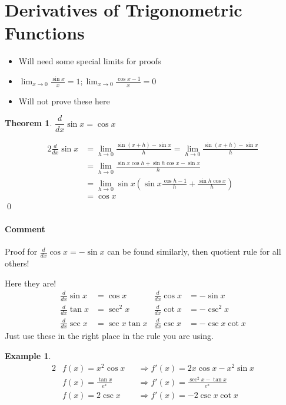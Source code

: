 \documentclass[letterpaper, 11pt, openany]{book}
\theoremstyle{mytheoremstyle}
\newtheorem{theorem}{Theorem}[section]
\renewenvironment{proof}{{\par \sffamily \smaller \fontseries{b}\selectfont Proof}}{\hfill\qed}
\theoremstyle{myexamplestyle}
\newtheorem{example}{Example}[section]
\newenvironment{commentary}{\paragraph{\sffamily \smaller \fontseries{b}\selectfont Comment}}{}
\begin{document}
\section{Derivatives of Trigonometric Functions}

\begin{itemize}
    \item Will need some special limits for proofs
    \item \(\displaystyle \lim_{x \to 0} \frac{\sin x}{x} = 1; \lim_{x \to 0} \frac{\cos x - 1}{x} = 0\)
    \item Will not prove these here
\end{itemize}

\begin{theorem}
    \(\dfrac{d}{dx} \sin x = \cos x\)
\end{theorem}
\begin{proof}
    \begin{alignat*}{2}
        \frac{d}{dx} \sin x     &= \lim_{h \to 0} \frac{\sin(x+h) - \sin x}{h} = \lim_{h \to 0} \frac{\sin(x+h) - \sin x}{h}\\
                                &= \lim_{h \to 0} \frac{\sin x \cos h + \sin h \cos x - \sin x}{h}\\
                                &= \lim_{h \to 0} \sin x\left(\sin x\frac{\cos h - 1}{h} + \frac{\sin h \cos x}{h}\right)\\
                                &= \cos x
    \end{alignat*}
\end{proof}
\begin{commentary}
    Proof for \(\frac{d}{dx} \cos x = -\sin x\) can be found similarly, then quotient rule for all others!
\end{commentary}

Here they are!
\begin{align*}
    \frac{d}{dx} \sin x &= \cos x           & \frac{d}{dx} \cos x &= -\sin x\\
    \frac{d}{dx} \tan x &= \sec^{2} x       & \frac{d}{dx} \cot x &= -\csc^{2} x\\
    \frac{d}{dx} \sec x &= \sec x \tan x    & \frac{d}{dx} \csc x &= -\csc x \cot x
\end{align*}
Just use these in the right place in the rule you are using.

\begin{example}
    \begin{alignat*}{2}
        &f(x) = x^{2}\cos x &&\Rightarrow f'(x) = 2x \cos x - x^{2}\sin x\\
        &f(x) = \frac{\tan x}{e^{x}} &&\Rightarrow f'(x) = \frac{\sec^{2}x - \tan x}{e^{x}}\\
        &f(x) = 2\csc x &&\Rightarrow f'(x) = -2\csc x \cot x
    \end{alignat*}
\end{example}
\end{document}
